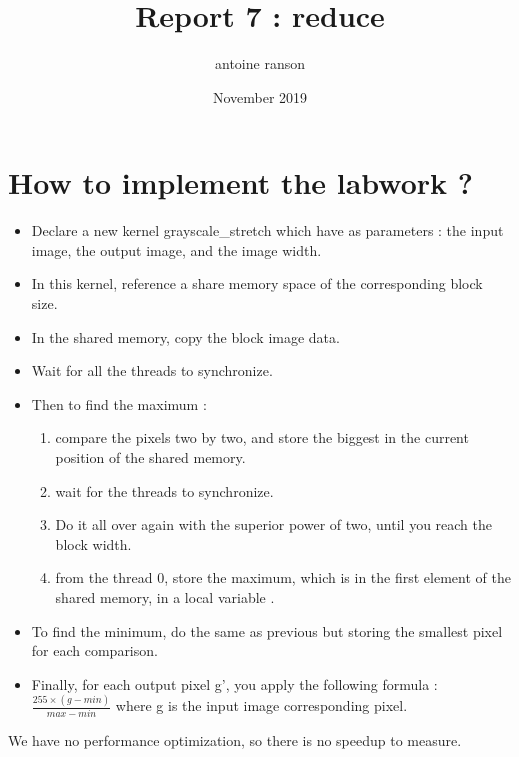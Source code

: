 \documentclass{article}
\title{Report 7 : reduce}
\author{antoine ranson }
\date{November 2019}
\begin{document}
 

\maketitle 

\section{How to implement the labwork ?} \newline 
\begin{itemize} 
\item Declare a new kernel grayscale\_stretch which have as parameters : the input image, the output image, and the image width. 
\item In this kernel, reference a share memory space of the corresponding block size. 
\item In the shared memory, copy the block image data. 
\item Wait for all the threads to synchronize. 
\item Then to find the maximum :
\indent \begin{enumerate} 
\item compare the pixels two by two, and store the biggest in the current position of the shared memory. 
\item wait for the threads to synchronize. 
\item Do it all over again with the superior power of two, until you reach the block width. 
\item from the thread 0, store the maximum, which is in the first element of the shared memory, in 
a local variable . 
\end{enumerate} 
\item To find the minimum, do the same as previous but storing the smallest pixel for each comparison. 
\item Finally, for each output pixel g', you apply the following formula : 
$\frac{255\times(g - min)}{max - min}$ where g is the input image corresponding pixel. 
\end{itemize} 

We have no performance optimization, so there is no speedup to measure. 
\end{document}
